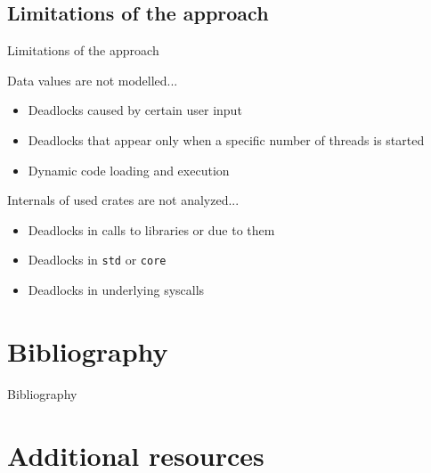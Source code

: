 \documentclass{beamer}
\begin{document}
\subsection{Limitations of the approach}

\begin{frame}{Limitations of the approach}

  Data values are not modelled...

  \begin{itemize}
    \item Deadlocks caused by certain user input
    \item Deadlocks that appear only when a specific number of threads is started
    \item Dynamic code loading and execution
  \end{itemize}

  \vfill
  \pause

  Internals of used crates are not analyzed...

  \begin{itemize}
    \item Deadlocks in calls to libraries or due to them
    \item Deadlocks in \texttt{std} or \texttt{core}
    \item Deadlocks in underlying syscalls
  \end{itemize}

\end{frame}

\section{Bibliography}

\begin{frame}[allowframebreaks]{Bibliography}
  \tiny
  
  
\end{frame}

\section{Additional resources}
\end{document}
